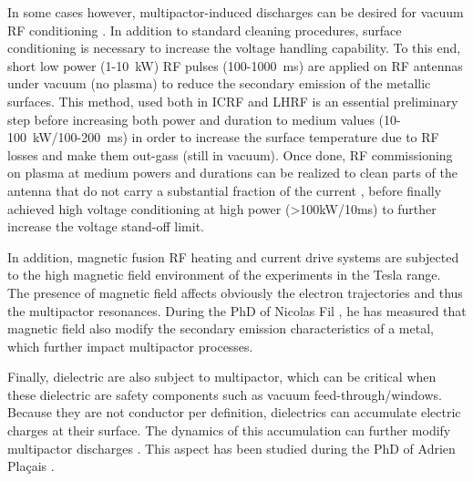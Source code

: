 In some cases however, multipactor-induced discharges can be desired for vacuum RF conditioning . In addition to standard cleaning procedures, surface conditioning is necessary to increase the voltage handling capability. To this end, short low power (1-10~kW) RF pulses (100-1000~ms) are applied on RF antennas under vacuum (no plasma) to reduce the secondary emission of the metallic surfaces. This method, used both in ICRF  and LHRF  is an essential preliminary step before increasing both power and duration to medium values (10-100~kW/100-200~ms) in order to increase the surface temperature due to RF losses and make them out-gass (still in vacuum). Once done, RF commissioning on plasma at medium powers and durations can be realized to clean parts of the antenna that do not carry a substantial fraction of the current , before finally achieved high voltage conditioning at high power (>100kW/10ms) to further increase the voltage stand-off limit.

In addition, magnetic fusion RF heating and current drive systems are subjected to the high magnetic field environment of the experiments in the Tesla range. The presence of magnetic field affects obviously the electron trajectories and thus the multipactor resonances. During the PhD of Nicolas Fil , he has measured that magnetic field also modify the secondary emission characteristics of a metal, which further impact multipactor processes. 

Finally, dielectric are also subject to multipactor, which can be critical when these dielectric are safety components such as vacuum feed-through/windows. Because they are not conductor per definition, dielectrics can accumulate electric charges at their surface. The dynamics of this accumulation can further modify multipactor discharges . This aspect has been studied during the PhD of Adrien Plaçais .


